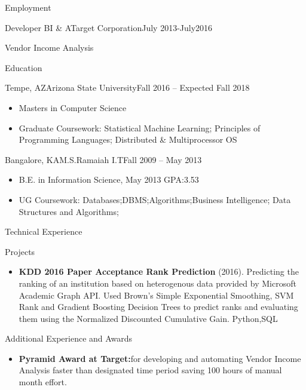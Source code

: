 \documentclass[]{nakulcv}
\begin{document}
\begin{cvsection}{Employment}
\begin{cvsubsection}{Developer BI \& A}{Target Corporation}{July 2013-July2016}
\begin{cvsubsection}{Vendor Income Analysis}{}{}
\begin{itemize}
				\end{itemize}
			\end{cvsubsection}
		\end{cvsubsection}
	\begin{cvsection}{Education}
		\begin{cvsubsection}{Tempe, AZ}{Arizona State University}{Fall 2016 -- Expected Fall 2018}
			\begin{itemize}
				\item Masters in Computer Science
				\item Graduate Coursework: Statistical Machine Learning; Principles of Programming Languages; Distributed \& Multiprocessor OS
			\end{itemize}
		\end{cvsubsection}
		\begin{cvsubsection}{Bangalore, KA}{M.S.Ramaiah I.T}{Fall 2009 -- May 2013}
			\begin{itemize}
				\item B.E. in Information Science, May 2013 GPA:3.53
				\item UG Coursework: Databases;DBMS;Algorithms;Business Intelligence; Data Structures and Algorithms;
			\end{itemize}
		\end{cvsubsection}
	\end{cvsection}
	\begin{cvsection}{Technical Experience}
		\begin{cvsubsection}{Projects}{}{}
			\begin{itemize}
				\item \textbf{KDD 2016 Paper Acceptance Rank Prediction} (2016). Predicting the ranking of an institution based on heterogenous data provided by Microsoft Academic Graph API. Used Brown's Simple Exponential Smoothing, SVM Rank and Gradient Boosting Decision Trees to predict ranks and evaluating them using the Normalized Discounted Cumulative Gain. Python,SQL 
			\end{itemize}
		\end{cvsubsection}
	\end{cvsection}
	\begin{cvsection}{Additional Experience and Awards}
		\begin{cvsubsection}{}{}{}	
			\begin{itemize}
				\item \textbf{Pyramid Award at Target:}for developing and automating Vendor Income Analysis faster than designated time period saving 100 hours of manual month effort.

\end{itemize}
\end{cvsubsection}
\end{cvsection}
\end{cvsection}
\end{document}
